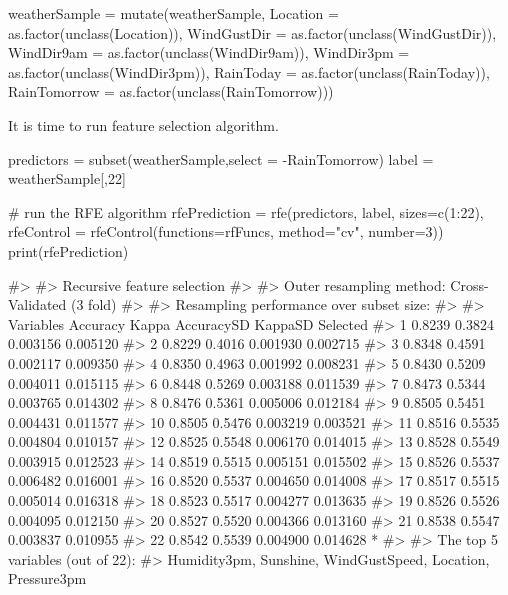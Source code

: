 \begin{Schunk}
\begin{Sinput}
weatherSample = mutate(weatherSample, Location = as.factor(unclass(Location)), 
          WindGustDir = as.factor(unclass(WindGustDir)),
          WindDir9am = as.factor(unclass(WindDir9am)), WindDir3pm = as.factor(unclass(WindDir3pm)),
          RainToday = as.factor(unclass(RainToday)), RainTomorrow = as.factor(unclass(RainTomorrow)))
\end{Sinput}
\end{Schunk}

It is time to run feature selection algorithm.

\begin{Schunk}
\begin{Sinput}
predictors = subset(weatherSample,select = -RainTomorrow)
label = weatherSample[,22]

# run the RFE algorithm
rfePrediction = rfe(predictors, label, sizes=c(1:22), 
                    rfeControl = rfeControl(functions=rfFuncs, method="cv", number=3))
print(rfePrediction)
\end{Sinput}
\begin{Soutput}
#> 
#> Recursive feature selection
#> 
#> Outer resampling method: Cross-Validated (3 fold) 
#> 
#> Resampling performance over subset size:
#> 
#>  Variables Accuracy  Kappa AccuracySD  KappaSD Selected
#>          1   0.8239 0.3824   0.003156 0.005120         
#>          2   0.8229 0.4016   0.001930 0.002715         
#>          3   0.8348 0.4591   0.002117 0.009350         
#>          4   0.8350 0.4963   0.001992 0.008231         
#>          5   0.8430 0.5209   0.004011 0.015115         
#>          6   0.8448 0.5269   0.003188 0.011539         
#>          7   0.8473 0.5344   0.003765 0.014302         
#>          8   0.8476 0.5361   0.005006 0.012184         
#>          9   0.8505 0.5451   0.004431 0.011577         
#>         10   0.8505 0.5476   0.003219 0.003521         
#>         11   0.8516 0.5535   0.004804 0.010157         
#>         12   0.8525 0.5548   0.006170 0.014015         
#>         13   0.8528 0.5549   0.003915 0.012523         
#>         14   0.8519 0.5515   0.005151 0.015502         
#>         15   0.8526 0.5537   0.006482 0.016001         
#>         16   0.8520 0.5537   0.004650 0.014008         
#>         17   0.8517 0.5515   0.005014 0.016318         
#>         18   0.8523 0.5517   0.004277 0.013635         
#>         19   0.8526 0.5526   0.004095 0.012150         
#>         20   0.8527 0.5520   0.004366 0.013160         
#>         21   0.8538 0.5547   0.003837 0.010955         
#>         22   0.8542 0.5539   0.004900 0.014628        *
#> 
#> The top 5 variables (out of 22):
#>    Humidity3pm, Sunshine, WindGustSpeed, Location, Pressure3pm
\end{Soutput}
\end{Schunk}

